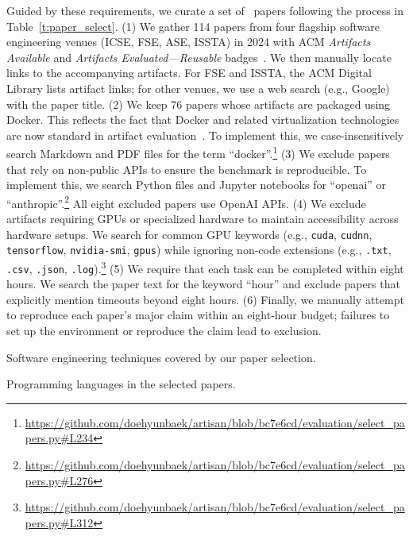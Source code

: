 Guided by these requirements, we curate a set of \papersetsize~papers following the process in Table~\ref{t:paper_select}.
(1) We gather 114 papers from four flagship software engineering venues (ICSE, FSE, ASE, ISSTA) in 2024 with ACM \emph{Artifacts Available} and \emph{Artifacts Evaluated—Reusable} badges~\cite{acm-artifact-badging-v1_1}.
We then manually locate links to the accompanying artifacts.
For FSE and ISSTA, the ACM Digital Library lists artifact links; for other venues, we use a web search (e.g., Google) with the paper title.
(2) We keep 76 papers whose artifacts are packaged using Docker.
This reflects the fact that Docker and related virtualization technologies are now standard in artifact evaluation~\cite{icse2024-ae,fse2024-ae,ase2024-ae}.
To implement this, we case-insensitively search Markdown and PDF files for the term ``docker''.\footnote{\url{https://github.com/doehyunbaek/artisan/blob/bc7e6cd/evaluation/select_papers.py\#L234}}
(3) We exclude papers that rely on non-public APIs to ensure the benchmark is reproducible.
To implement this, we search Python files and Jupyter notebooks for ``openai'' or ``anthropic''.\footnote{\url{https://github.com/doehyunbaek/artisan/blob/bc7e6cd/evaluation/select_papers.py\#L276}}
All eight excluded papers use OpenAI APIs.
(4) We exclude artifacts requiring GPUs or specialized hardware to maintain accessibility across hardware setups.
We search for common GPU keywords (e.g., \texttt{cuda}, \texttt{cudnn}, \texttt{tensorflow}, \texttt{nvidia-smi}, \texttt{gpus}) while ignoring non-code extensions (e.g., \texttt{.txt}, \texttt{.csv}, \texttt{.json}, \texttt{.log}).\footnote{\url{https://github.com/doehyunbaek/artisan/blob/bc7e6cd/evaluation/select_papers.py\#L312}}
(5) We require that each task can be completed within eight hours.
We search the paper text for the keyword ``hour'' and exclude papers that explicitly mention timeouts beyond eight hours.
(6) Finally, we manually attempt to reproduce each paper’s major claim within an eight-hour budget; failures to set up the environment or reproduce the claim lead to exclusion.

\begin{table}[t]
  \centering
  \begin{minipage}[t]{0.48\textwidth}
    \centering
    \caption{Software engineering techniques covered by our paper selection.}
    \label{t:topics}
    
  \end{minipage}\hfill
  \begin{minipage}[t]{0.48\textwidth}
    \centering
    \caption{Programming languages in the selected papers.}
    \label{t:languages}
    
  \end{minipage}
\end{table}

